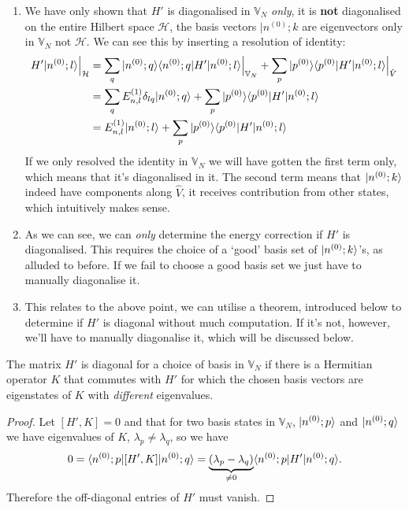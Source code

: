 \begin{enumerate}
	\item We have only shown that $H'$ is diagonalised in $\mathbb{V}_N$ \textit{only}, it is \textbf{not} diagonalised on the entire Hilbert space $\mathcal{H}$, \ie the basis vectors $|n^{(0)};k$ are eigenvectors only in $\mathbb{V}_N$ not $\mathcal{H}$. We can see this by inserting a resolution of identity:
	\begin{equation}
	\begin{aligned}
	H'|n^{(0)};l\rangle\Big|_{\mathcal{H}}&=\sum_q |n^{(0)};q\rangle \langle n^{(0)};q |H'|n^{(0)};l \rangle\Big|_{\mathbb{V}_N}+\sum_p |p^{(0)}\rangle \langle p^{(0)}|H' |n^{(0)};l \rangle\Big|_{\hat{V}}\\
	&=\sum_q E_{n,l}^{(1)}\delta_{lq}|n^{(0)};q\rangle+\sum_p |p^{(0)}\rangle \langle p^{(0)}|H' |n^{(0)};l \rangle\\
	&=E_{n,l}^{(1)}|n^{(0)};l\rangle+\sum_p |p^{(0)}\rangle \langle p^{(0)}|H' |n^{(0)};l \rangle
	\end{aligned}
	\end{equation}
	If we only resolved the identity in $\mathbb{V}_N$ we will have gotten the first term only, which means that it's diagonalised in it. The second term means that $|n^{(0)};k\rangle$ indeed have components along $\hat{V}$, \ie it receives contribution from other states, which intuitively makes sense. 
	\item As we can see, we can \textit{only} determine the energy correction if $H'$ is diagonalised. This requires the choice of a `good' basis set of $|n^{(0)};k\rangle$'s, as alluded to before. If we fail to choose a good basis set we just have to manually diagonalise it. 
	\item This relates to the above point, we can utilise a theorem, introduced below to determine if $H'$ is diagonal without much computation. If it's not, however, we'll have to manually diagonalise it, which will be discussed below. 
\end{enumerate}
\begin{thrm}
The matrix $H'$ is diagonal for a choice of basis in $\mathbb{V}_N$ if there is a 
Hermitian operator $K$ that commutes with $H'$ for which the chosen basis vectors are 
eigenstates of $K$ with \textit{different} eigenvalues. 
\end{thrm}
\begin{proof}
Let $[H',K]=0$ and that for two basis states in $\mathbb{V}_N$, $|n^{(0)};p\rangle$ and $|n^{(0)};q\rangle$ we have eigenvalues of $K$, $\lambda_p\neq\lambda_q$, so we have
\begin{equation}
0=\langle n^{(0)};p|[H',K]|n^{(0)};q \rangle=\underbrace{(\lambda_p-\lambda_q)}_{\neq0}\langle n^{(0)};p|H'|n^{(0)};q \rangle.
\end{equation}
Therefore the off-diagonal entries of $H'$ must vanish. 
\end{proof}
